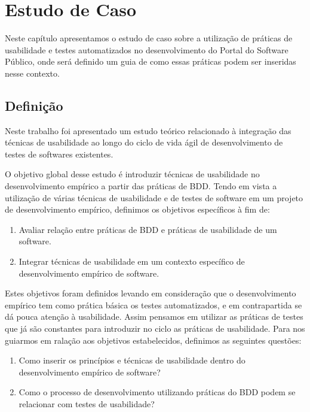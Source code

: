 \chapter{Estudo de Caso}

Neste capítulo apresentamos o estudo de caso sobre a utilização de práticas de usabilidade e testes automatizados no desenvolvimento do Portal do Software Público, onde será definido um guia de como essas práticas podem ser inseridas nesse contexto.

\section{Definição}

Neste trabalho foi apresentado um estudo teórico relacionado à integração das técnicas de usabilidade ao longo do ciclo de vida ágil de desenvolvimento de testes de softwares existentes.

O objetivo global desse estudo é introduzir técnicas de usabilidade no desenvolvimento empírico a partir das práticas de BDD.
%
Tendo em vista a utilização de várias técnicas de usabilidade e de testes de software em um projeto de desenvolvimento empírico, definimos os objetivos específicos à fim de:

\begin{enumerate}
\item Avaliar relação entre práticas de BDD e práticas de usabilidade de um software. 

\item Integrar técnicas de usabilidade em um contexto específico de desenvolvimento empírico de software.
\end{enumerate}

Estes objetivos foram definidos levando em consideração que o desenvolvimento empírico tem como prática básica os testes automatizados, e em contrapartida se dá pouca atenção à usabilidade. Assim pensamos em utilizar as práticas de testes que já são constantes para introduzir no ciclo as práticas de usabilidade.
Para nos guiarmos  em ralação aos objetivos estabelecidos, definimos as seguintes questões:

\begin{enumerate}
\item Como inserir os princípios e técnicas de usabilidade dentro do desenvolvimento empírico de software?
\item Como o processo de desenvolvimento utilizando práticas do BDD podem se relacionar com testes de usabilidade?
\end{enumerate}

